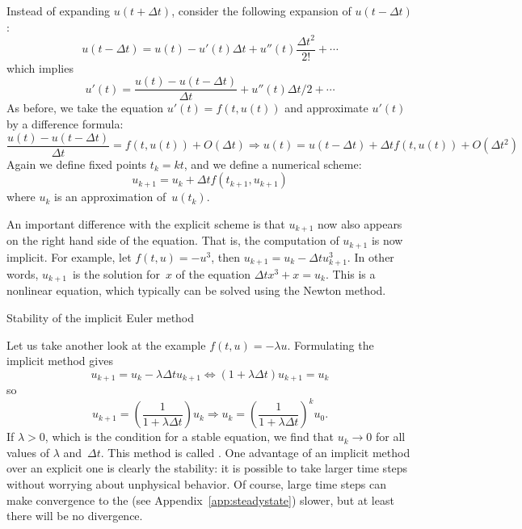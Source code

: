 Instead of expanding $u(t+\Delta t)$, consider the following expansion
of $u(t-\Delta t)$:
\begin{equation}
  u(t-\Delta t)=u(t)-u'(t)\Delta t+u''(t)\frac{\Delta t^2}{2!}+\cdots
\end{equation}
which implies
\begin{equation}
  u'(t)=\frac{u(t)-u(t-\Delta t)}{\Delta t}+u''(t)\Delta t/2+\cdots
\end{equation}
As before, we take the equation $u'(t)=f(t,u(t))$ and
approximate $u'(t)$ by a difference formula:
\begin{equation}
  \frac{u(t)-u(t-\Delta t)}{\Delta t}=f(t,u(t)) +O(\Delta t)
   \Rightarrow u(t)=u(t-\Delta t)+\Delta t f(t,u(t))+O(\Delta t^2)
\end{equation}
Again we define fixed points $t_k=kt$,
and we define a numerical scheme:
\begin{equation}
  u_{k+1}=u_k+\Delta tf(t_{k+1},u_{k+1})
\end{equation}
where $u_k$ is an approximation of~$u(t_k)$.

An important difference with the explicit scheme is that $u_{k+1}$ now
also appears on the right hand side of the equation. That is,
the computation of $u_{k+1}$ is now implicit.
For example, let $f(t,u)=-u^3$, then $u_{k+1}=u_k-\Delta t
u_{k+1}^3$. In other words, $u_{k+1}$~is the solution for~$x$ of the
equation $\Delta t x^3+x=u_k$. This is a nonlinear equation, which
typically can be solved using the Newton method.

 {Stability of the implicit Euler method}
\label{sec:stability-e-impl}

Let us take another look at the example $f(t,u)=-\lambda
u$. Formulating the implicit method gives
\begin{equation}
  u_{k+1}=u_k-\lambda \Delta t u_{k+1} \Leftrightarrow
    (1+\lambda\Delta t)u_{k+1}=u_k
\end{equation}
so
\begin{equation}
    u_{k+1}=\left (\frac1{1+\lambda\Delta t}\right)u_k \Rightarrow
    u_k=\left (\frac1{1+\lambda\Delta t}\right)^ku_0.
\end{equation}
If $\lambda>0$, which is the condition for a stable equation, we find
that $u_k\rightarrow0$ for all values of $\lambda$ and~$\Delta
t$. This method is called .  One
advantage of an implicit method over an explicit one is clearly
the stability: it is possible to take larger time steps without
worrying about unphysical behavior. Of course, large time steps can
make convergence to the  (see
Appendix~\ref{app:steadystate}) slower, but at least there will be no
divergence.

